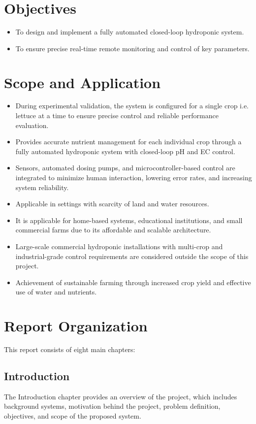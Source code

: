 \section{Objectives}
\begin{itemize}
    \item To design and implement a fully automated closed-loop hydroponic system.
    \item To ensure precise real-time remote monitoring and control of key parameters.
\end{itemize}

\section{Scope and Application}
\begin{itemize}
    \item During experimental validation, the system is configured for a single crop i.e. lettuce at a time to ensure precise control and reliable performance evaluation.
    \item Provides accurate nutrient management for each individual crop through a fully automated hydroponic system with closed-loop pH and EC control.
    \item Sensors, automated dosing pumps, and microcontroller-based control are integrated to minimize human interaction, lowering error rates, and increasing system reliability.
    \item Applicable in settings with scarcity of land and water resources.
    \item It is applicable for home-based systems, educational institutions, and small commercial farms due to its affordable and scalable architecture.
    \item Large-scale commercial hydroponic installations with multi-crop and industrial-grade control requirements are considered outside the scope of this project.
    \item Achievement of sustainable farming through increased crop yield and effective use of water and nutrients.
\end{itemize}

\section{Report Organization}
This report consists of eight main chapters:

\subsection{Introduction}
The Introduction chapter provides an overview of the project, which includes background systems, motivation behind the project, problem definition, objectives, and scope of the proposed system. 

